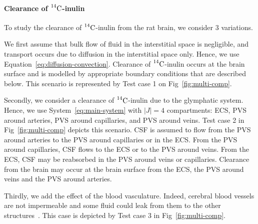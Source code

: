 \documentclass[10pt]{article}
\newcommand{\VV}[1]{\textcolor{red}{VV: #1}}
\newcommand{\1}{^{(1)}}
\newcommand{\2}{^{(2)}}
\newcommand{\abs}[1]{\left\lvert#1\right\rvert}
\newcommand{\Cinulin}{$\prescript{14}{}{\text{C}}$-inulin }
\begin{document}




\paragraph{Clearance of \Cinulin}
To study the clearance of \Cinulin from the rat brain, we consider $3$ variations. 

We first assume that bulk flow of fluid in the interstitial space is negligible, and transport occurs due to diffusion in the interstitial space only. Hence, we use Equation~\eqref{eq:diffusion-convection}. Clearance of \Cinulin occurs at the brain surface and is modelled by appropriate boundary conditions that are described below. This scenario is represented by Test case 1 on Fig~\ref{fig:multi-comp}.

Secondly, we consider a clearance of \Cinulin due to the glymphatic system. Hence, we use System~\eqref{eq:main-system} with $\abs{J}=4$ compartments: ECS, PVS around arteries, PVS around capillaries, and PVS around veins. Test case 2 in Fig~\ref{fig:multi-comp} depicts this scenario. CSF is assumed to flow from the PVS around arteries to the PVS around capillaries or in the ECS. From the PVS around capillaries, CSF flows to the ECS or to the PVS around veins. From the ECS, CSF may be reabsorbed in the PVS around veins or capillaries. Clearance from the brain may occur at the brain surface from the ECS, the PVS around veins and the PVS around arteries.

Thirdly, we add the effect of the blood vasculature. Indeed, cerebral blood vessels are not impermeable and some fluid could leak from them to the other structures~\cite{Oreskovic-2010-formation}. This case is depicted by Test case 3 in Fig~\ref{fig:multi-comp}. 
\end{document}

